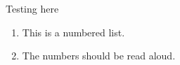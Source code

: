 \documentclass{article}
\begin{document}
Testing here

\begin{enumerate}
    \item This is a numbered list.
    \item The numbers should be read aloud.
\end{enumerate}
\end{document}
